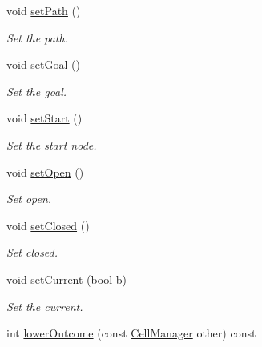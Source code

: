 \begin{DoxyCompactItemize}
void \mbox{\hyperlink{class_cell_manager_af8df05e6720c3a35b68ee8ace9494810}{set\+Path}} ()
\begin{DoxyCompactList}\small\item\em Set the path. \end{DoxyCompactList}\item 
\mbox{\label{class_cell_manager_ac883cd92316dab0de2970504b4485d59}} 
void \mbox{\hyperlink{class_cell_manager_ac883cd92316dab0de2970504b4485d59}{set\+Goal}} ()
\begin{DoxyCompactList}\small\item\em Set the goal. \end{DoxyCompactList}\item 
\mbox{\label{class_cell_manager_ac105b2613f3c976a86562777d254b486}} 
void \mbox{\hyperlink{class_cell_manager_ac105b2613f3c976a86562777d254b486}{set\+Start}} ()
\begin{DoxyCompactList}\small\item\em Set the start node. \end{DoxyCompactList}\item 
\mbox{\label{class_cell_manager_a744dc1d4a66749a7e4f6f6489451eb2d}} 
void \mbox{\hyperlink{class_cell_manager_a744dc1d4a66749a7e4f6f6489451eb2d}{set\+Open}} ()
\begin{DoxyCompactList}\small\item\em Set open. \end{DoxyCompactList}\item 
\mbox{\label{class_cell_manager_a177a7b719bf7d7d5befe87a08debc753}} 
void \mbox{\hyperlink{class_cell_manager_a177a7b719bf7d7d5befe87a08debc753}{set\+Closed}} ()
\begin{DoxyCompactList}\small\item\em Set closed. \end{DoxyCompactList}\item 
void \mbox{\hyperlink{class_cell_manager_a54ad62f93aa0c271f3ebadbd45a9d941}{set\+Current}} (bool b)
\begin{DoxyCompactList}\small\item\em Set the current. \end{DoxyCompactList}\item 
int \mbox{\hyperlink{class_cell_manager_a51c6a0e10fecbe8a9e349574e3d1f69c}{lower\+Outcome}} (const \mbox{\hyperlink{class_cell_manager}{Cell\+Manager}} other) const

\end{DoxyCompactItemize}
